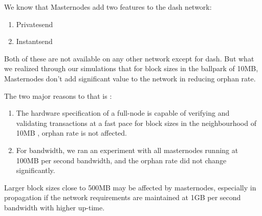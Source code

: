 \documentclass{article}
\begin{document}
We know that Masternodes add two features to the dash network:

\begin{enumerate}
    \item Privatesend
    \item Instantsend
\end{enumerate}

Both of these are not available on any other network except for dash. But what we realized through our simulations that
for block sizes in the ballpark of 10MB, Masternodes don't add significant value to the network in reducing orphan rate.

The two major reasons to that is :

\begin{enumerate}
    \item The hardware specification of a full-node is capable of verifying and validating transactions at a fast
        pace for block sizes in the neighbourhood of 10MB , orphan rate is not affected. 
    \item For bandwidth, we ran an experiment with all masternodes running at 100MB per second bandwidth, and the orphan
        rate did not change significantly.
\end{enumerate}

Larger block sizes close to 500MB may be affected by masternodes, especially in propagation if the network requirements
are maintained at 1GB per second bandwidth with higher up-time.  

  
  
\end{document}
